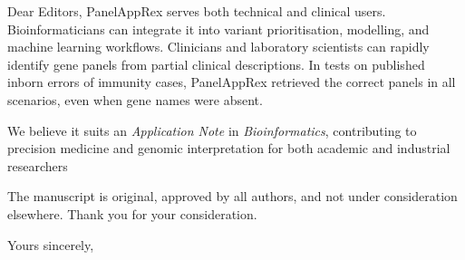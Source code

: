 \documentclass[12pt,a4paper]{letter}
\begin{document}
\begin{letter}{Dear Editors,}
PanelAppRex serves both technical and clinical users. Bioinformaticians can integrate it into variant prioritisation, modelling, and machine learning workflows. Clinicians and laboratory scientists can rapidly identify gene panels from partial clinical descriptions. In tests on published inborn errors of immunity cases, PanelAppRex retrieved the correct panels in all scenarios, even when gene names were absent.

We believe it suits an \textit{Application Note} in \textit{Bioinformatics}, contributing to precision medicine and genomic interpretation for both academic and industrial researchers

The manuscript is original, approved by all authors, and not under consideration elsewhere. Thank you for your consideration.

\closing{Yours sincerely,}

\end{letter}
\end{document}
